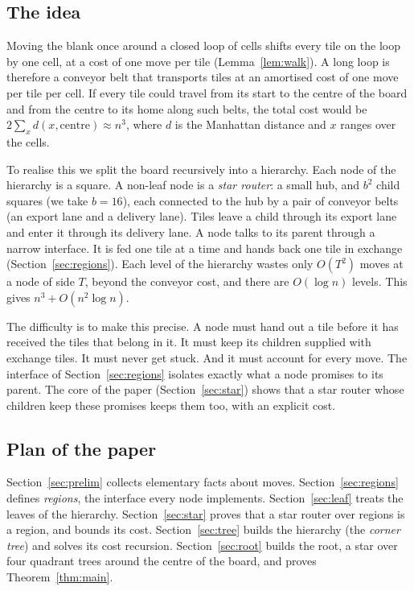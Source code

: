 \documentclass[11pt]{amsart}
\theoremstyle{definition}
\begin{document}
\subsection*{The idea}
Moving the blank once around a closed loop of cells shifts every tile on the loop by one
cell, at a cost of one move per tile (Lemma~\ref{lem:walk}). A
long loop is therefore a conveyor belt that transports tiles at an amortised cost of
one move per tile per cell. If every tile could travel from its start to the
centre of the board and from the centre to its home along such belts, the total cost would be
$2\sum_x d(x,\text{centre})\approx n^3$, where $d$ is the Manhattan distance and $x$ ranges over the cells.

To realise this we split the board recursively into a hierarchy. Each node of
the hierarchy is a square. A non-leaf node is a \emph{star router}: a small hub, and $b^2$ child
squares (we take $b=16$), each connected to the hub by a pair of conveyor
belts (an export lane and a delivery lane). Tiles leave a child through its
export lane and enter it through its delivery lane. A node talks to its parent
through a narrow interface. It is fed one tile at a time and hands back one
tile in exchange (Section~\ref{sec:regions}). Each level of the hierarchy wastes
only $O(T^2)$ moves at a node of side $T$, beyond the conveyor cost, and there are
$O(\log n)$ levels. This gives $n^3+O(n^2\log n)$.

The difficulty is to make this precise. A node must hand out a tile before
it has received the tiles that belong in it. It must keep its children supplied
with exchange tiles. It must never get stuck. And it must account for every
move. The interface of Section~\ref{sec:regions} isolates exactly what a node
promises to its parent. The core of the paper (Section~\ref{sec:star}) shows that a star
router whose children keep these promises keeps them too, with an explicit cost.

\subsection*{Plan of the paper}
Section~\ref{sec:prelim} collects elementary facts about moves.
Section~\ref{sec:regions} defines \emph{regions}, the interface every node
implements. Section~\ref{sec:leaf} treats the leaves of the hierarchy.
Section~\ref{sec:star} proves that a star router over regions is a region, and
bounds its cost. Section~\ref{sec:tree} builds the hierarchy (the \emph{corner
tree}) and solves its cost recursion. Section~\ref{sec:root} builds the root,
a star over four quadrant trees around the centre of the board, and proves
Theorem~\ref{thm:main}.
\end{document}
